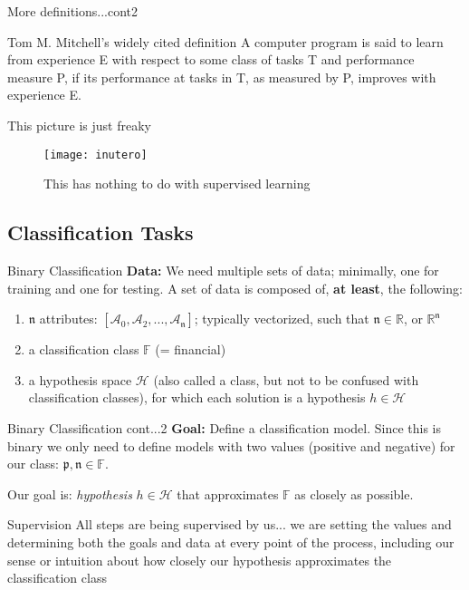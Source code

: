 \documentclass{beamer}
\begin{document}
\begin{frame}{More definitions...cont2}
\begin{exampleblock}{Tom M. Mitchell's widely cited definition}	
	 A computer program is said to learn from experience E with respect to some class of tasks T and performance measure P, if its performance at tasks in T, as measured by P, improves with experience E.
\end{exampleblock}
\end{frame}

\begin{frame}{This picture is just freaky}
	\begin{figure}[htpb]
		\begin{center}
			\texttt{[image: inutero]}\caption{\scriptsize This has nothing to do with supervised learning}
		\end{center}
	\end{figure}
\end{frame}


\subsection{Classification Tasks}
\begin{frame}{Binary Classification}\label{bin-classification}
{\bf Data:} We need multiple sets of data; minimally, one for training and one for testing. A set of data is composed of, {\bf at least}, the following:
\begin{enumerate}
\item $\mathfrak{n}$ attributes: $[\mathcal{A}_0, \mathcal{A}_2, ..., \mathcal{A}_\mathfrak{n}]$; typically vectorized, such that $\mathfrak{n} \in \mathbb{R}$, or $\mathbb{R}^\mathfrak{n}$
\item a classification class $\mathbb{F}$ (= {\sc financial})
\item a hypothesis space $\mathcal{H}$ (also called a class, but not to be confused with  classification classes), for which each solution is a hypothesis $\mathit{h} \in \mathcal{H}$
\end{enumerate}
\end{frame}

\begin{frame}{Binary Classification cont...2}\label{bin2-classification}
{\bf Goal:} Define a classification model. Since this is binary we only need to define models with two values (positive and negative) for our class: $ { \mathfrak{p}, \mathfrak{n} } \in \mathbb{F}$.

Our goal is: {\sl hypothesis} $\mathit{h} \in \mathcal{H}$ that approximates $\mathbb{F}$ as closely as possible.

\begin{exampleblock}{Supervision}
	All steps are being supervised by us... we are setting the values and determining both the goals and data at every point of the process, including our sense or intuition about how closely our hypothesis approximates the classification class
\end{exampleblock}
\end{frame}
\end{document}
